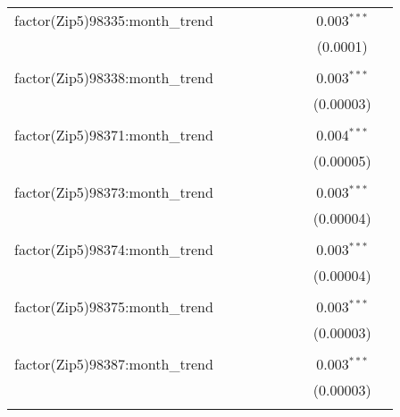 \begin{table}[H]
{\begin{tabular}{@{\extracolsep{5pt}}lcccccccc}
  factor(Zip5)98335:month\_trend &  &  &  &  &  &  & 0.003$^{***}$ &  \\  

   &  &  &  &  &  &  & (0.0001) &  \\  

   & & & & & & & & \\  

  factor(Zip5)98338:month\_trend &  &  &  &  &  &  & 0.003$^{***}$ &  \\  

   &  &  &  &  &  &  & (0.00003) &  \\  

   & & & & & & & & \\  

  factor(Zip5)98371:month\_trend &  &  &  &  &  &  & 0.004$^{***}$ &  \\  

   &  &  &  &  &  &  & (0.00005) &  \\  

   & & & & & & & & \\  

  factor(Zip5)98373:month\_trend &  &  &  &  &  &  & 0.003$^{***}$ &  \\  

   &  &  &  &  &  &  & (0.00004) &  \\  

   & & & & & & & & \\  

  factor(Zip5)98374:month\_trend &  &  &  &  &  &  & 0.003$^{***}$ &  \\  

   &  &  &  &  &  &  & (0.00004) &  \\  

   & & & & & & & & \\  

  factor(Zip5)98375:month\_trend &  &  &  &  &  &  & 0.003$^{***}$ &  \\  

   &  &  &  &  &  &  & (0.00003) &  \\  

   & & & & & & & & \\  

  factor(Zip5)98387:month\_trend &  &  &  &  &  &  & 0.003$^{***}$ &  \\  

   &  &  &  &  &  &  & (0.00003) &  \\  

   & & & & & & & & \\  


\end{tabular}}
\end{table}
